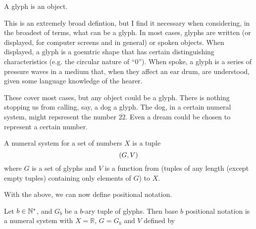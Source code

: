\documentclass{article}
\begin{document}
	\begin{definition}\label{def5}
		A glyph is an object.
	\end{definition}
	\begin{remark}
		This is an extremely broad defintion, but I find it necessary when considering, in the broadest of terms, what can be a glyph. In most cases, glyphs are written (or displayed, for computer screens and in general) or spoken objects. When displayed, a glyph is a goemtric shape that has certain distinguishing characteristics (e.g. the circular nature of ``0''). When spoke, a glyph is a series of pressure waves in a medium that, when they affect an ear drum, are understood, given some language knowledge of the hearer.
		
		These cover most cases, but any object could be a glyph. There is nothing stopping us from calling, say, a dog a glyph. The dog, in a certain numeral system, might repsresent the number $\overline{22}$. Even a dream could be chosen to represent a certain number.
	\end{remark}
	
	\begin{definition}\label{def 6}
		A numeral system for a set of numbers $X$ is a tuple
		$$\pqty{G, V}$$
		where $G$ is a set of glyphs and $V$ is a function from (tuples of any length (except empty tuples) containing only elements of $G$) to $X$.
	\end{definition}
	
	With the above, we can now define positional notation.
	
	\begin{definition}\label{def7}
		Let $b\in\mathbb{N}^*$, and $G_b$ be a $b$-ary tuple of glyphs. Then base $b$ positional notation is a numeral system with $X=\mathbb{R}$, $G=G_b$ and $V$ defined by
	\end{definition}
	
	
\end{document}
